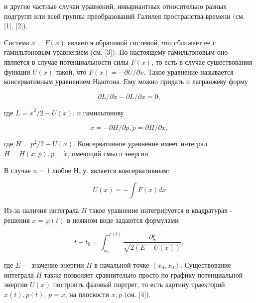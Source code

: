 \documentclass[10pt]{article}
\begin{document}
и другие частные случаи уравнений, инвариантных относительно разных подгрупп или всей группы преобразований Галилея пространства-времени (см. [1], [2]).



Система $\ddot{x}=F(x)$ является обратимой системой, что сближает ее с гамильтоновым уравнением (см. [3]). По настоящему гамильтоновым оно является в случае потенциальности силы $F(x)$, то есть в случае сушествования функции $U(x)$ такой, что $F(x)=-\partial U / \partial x$. Такое уравнение называется консервативным уравнением Ньютона. Ему можно придать и лагранжеву форму



\[

\partial L / \partial \dot{x}-\partial L / \partial x=0,

\]



где $L=\dot{x}^{2} / 2-U(x)$, и гамильтонову



\[

\dot{x}=-\partial H / \partial p, \dot{p}=\partial H / \partial x,

\]



где $H=p^{2} / 2+U(x)$. Консервативное уравнение имеет интеграл $H=H(x, p), p=\dot{x}$, имеющий смысл энергии.



В случае $n=1$ любое Н. у. является консервативным:



\[

U(x)=-\int F(x) d x

\]



Из-за наличия интеграла $H$ такое уравнение интегрируется в квадратурах - решения $x=\varphi(t)$ в неявном виде задаются формулами



\[

t-t_{0}=\int_{x_{0}}^{\varphi(t)} \frac{\partial \xi}{\sqrt{2(E-U(x))}},

\]



где $E-$ значение энергии $H$ в начальной точке $\left(x_{0}, \dot{x}_{0}\right)$. Существование интеграла $H$ также позволяет сравнительно просто по графику потенциальной энергии $U(x)$ построить фазовый портрет, то есть картину траекторий $x(t), p(t)$, $p=\dot{x}$, на плоскости $x, p$ (см. [4]).
\end{document}
